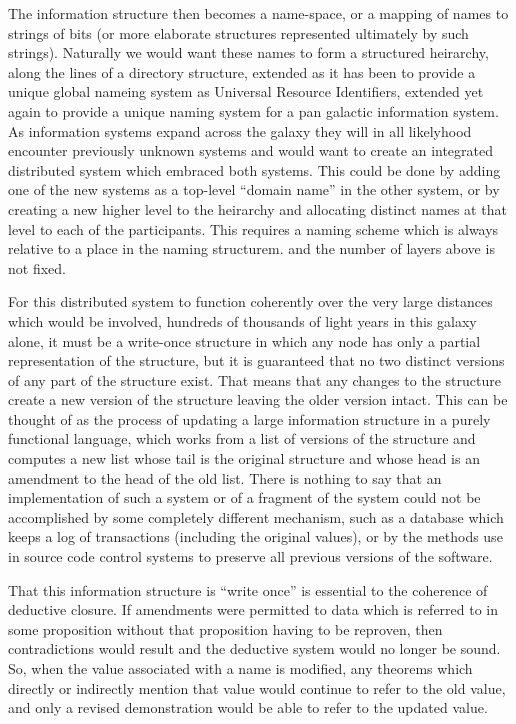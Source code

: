 \documentclass[10pt,titlepage]{book}
\begin{document}
The information structure then becomes a name-space, or a mapping of names to strings of bits (or more elaborate structures represented ultimately by such strings).
Naturally we would want these names to form a structured heirarchy, along the lines of a directory structure, extended as it has been to provide a unique global nameing system as Universal Resource Identifiers, extended yet again to provide a unique naming system for a pan galactic information system.
As information systems expand across the galaxy they will in all likelyhood encounter previously unknown systems and would want to create an integrated distributed system which embraced both systems.
This could be done by adding one of the new systems as a top-level ``domain name'' in the other system, or by creating a new higher level to the heirarchy and allocating distinct names at that level to each of the participants.
This requires a naming scheme which is always relative to a place in the naming structurem. and the number of layers above is not fixed.

For this distributed system to function coherently over the very large distances which would be involved, hundreds of thousands of light years in this galaxy alone, it must be a write-once structure in which any node has only a partial representation of the structure, but it is guaranteed that no two distinct versions of any part of the structure exist.
That means that any changes to the structure create a new version of the structure leaving the older version intact.
This can be thought of as the process of updating a large information structure in a purely functional language, which works from a list of versions of the structure and computes a new list whose tail is the original structure and whose head is an amendment to the head of the old list.
There is nothing to say that an implementation of such a system or of a fragment of the system could not be accomplished by some completely different mechanism, such as a database which keeps a log of transactions (including the original values), or by the methods use in source code control systems to preserve all previous versions of the software.

That this information structure is ``write once'' is essential to the coherence of deductive closure.
If amendments were permitted to data which is referred to in some proposition without that proposition having to be reproven, then contradictions would result and the deductive system would no longer be sound.
So, when the value associated with a name is modified, any theorems which directly or indirectly mention that value would continue to refer to the old value, and only a revised demonstration would be able to refer to the updated value.
\end{document}
